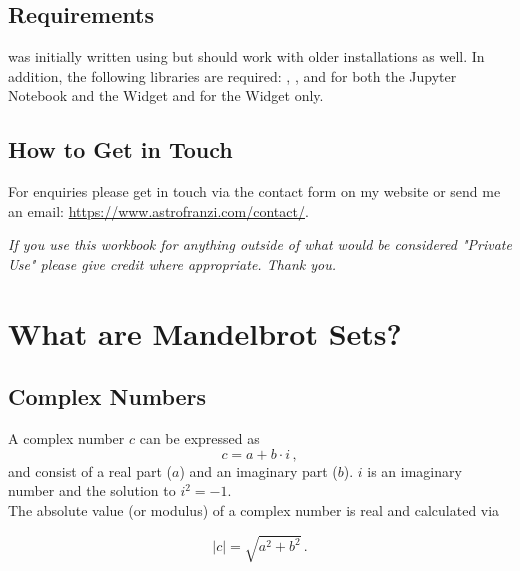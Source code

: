 \documentclass[
  12pt,					%
  a4paper,				%
  twoside,				%
]{report}
\begin{document}
\section{Requirements}
{} was initially written using {} but should work with older {} installations as well. In addition, the following {} libraries are required: {}, {}, and {} for both the Jupyter Notebook and the Widget and {} for the Widget only.


\section{How to Get in Touch}
For enquiries please get in touch via the contact form on my website
or send me an email: \url{https://www.astrofranzi.com/contact/}.

\vspace*{\fill}
\begin{center}
\textit{If you use this workbook for anything outside of what would be considered "Private Use" please give credit where appropriate. Thank you.}
\end{center}













\chapter{What are Mandelbrot Sets?}

\section{Complex Numbers}
A complex number $c$ can be expressed as
\begin{equation}
	c = a + b \cdot i\, ,
\end{equation}
and consist of a real part ($a$) and an imaginary part ($b$). $i$ is an imaginary number and the solution to $i^2 = -1$.\\

The absolute value (or modulus) of a complex number is real and calculated via

\begin{equation}
	|c| = \sqrt{a^2 + b^2}\, .
\end{equation}
\end{document}
